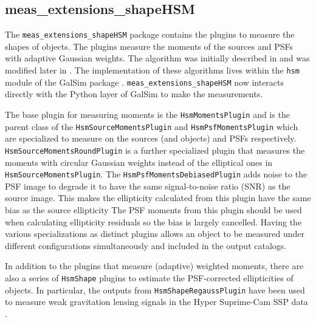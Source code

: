 \subsection{meas\_extensions\_shapeHSM}
\label{sec:meas_extensions_shapeHSM}

The \texttt{meas\_extensions\_shapeHSM} package contains the plugins to measure the shapes of objects.
The plugins measure the moments of the sources and PSFs with adaptive Gaussian weights.
The algorithm was initially described in \cite{2003MNRAS.343..459H} and was modified later in \cite{2005MNRAS.361.1287M}.
The implementation of these algorithms lives within the \texttt{hsm} module of the GalSim package \citep{2015A&C....10..121R}.
\texttt{meas\_extensions\_shapeHSM} now interacts directly with the Python layer of GalSim to make the measurements.

The base plugin for measuring moments is the \texttt{HsmMomentsPlugin} and is the parent class of the \texttt{HsmSourceMomentsPlugin} and \texttt{HsmPsfMomentsPlugin} which are specialized to measure on the sources (and objects) and PSFs respectively.
\texttt{HsmSourceMomentsRoundPlugin} is a further specialized plugin that measures the moments with circular Gaussian weights instead of the elliptical ones in \texttt{HsmSourceMomentsPlugin}.
The \texttt{HsmPsfMomentsDebiasedPlugin} adds noise to the PSF image to degrade it to have the same signal-to-noise ratio (SNR) as the source image.
This makes the ellipticity calculated from this plugin have the same bias as the source ellipticity
The PSF moments from this plugin should be used when calculating ellipticity residuals so the bias is largely cancelled.
Having the various specializations as distinct plugins allows an object to be measured under different configurations simultaneously and included in the output catalogs.

In addition to the plugins that measure (adaptive) weighted moments, there are also a series of \texttt{HsmShape} plugins to estimate the PSF-corrected ellipticities of objects.
In particular, the outputs from \texttt{HsmShapeRegaussPlugin} have been used to measure weak gravitation lensing signals in the Hyper Suprime-Cam SSP data \citep{2018PASJ...70S..25M, 2022PASJ...74..421L}.
